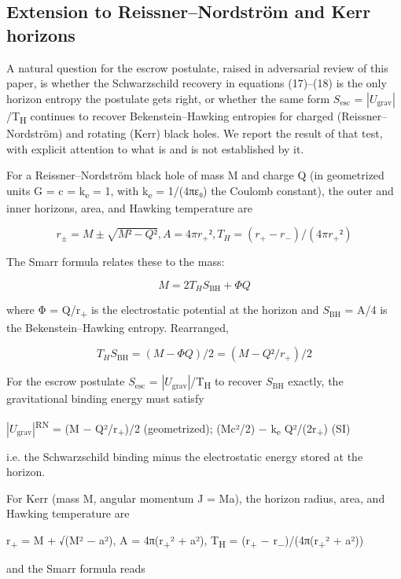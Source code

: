 \documentclass[11pt]{article}
\begin{document}
\subsection{Extension to Reissner--Nordström and Kerr horizons}

A natural question for the escrow postulate, raised in adversarial
review of this paper, is whether the Schwarzschild recovery in equations
(17)--(18) is the only horizon entropy the postulate gets right, or
whether the same form $S_{\mathrm{esc}}$ = $|U_{\mathrm{grav}}|$/T\textsubscript{H} continues to recover
Bekenstein--Hawking entropies for charged (Reissner--Nordström) and
rotating (Kerr) black holes. We report the result of that test, with
explicit attention to what is and is not established by it.

For a Reissner--Nordström black hole of mass M and charge Q (in
geometrized units G = c = k\textsubscript{e} = 1, with k\textsubscript{e} = 1/(4πε₀) the Coulomb
constant), the outer and inner horizons, area, and Hawking temperature
are

\[ r_\pm  = M \pm  \sqrt{M² - Q²}, A = 4πr_+², T_H = (r_+ - r_-)/(4πr_+²) \]

The Smarr formula relates these to the mass:

\[ M = 2T_H S_{\mathrm{BH}} + Φ Q \]

where Φ = Q/r\textsubscript{+} is the electrostatic potential at the horizon and $S_{\mathrm{BH}}$
= A/4 is the Bekenstein--Hawking entropy. Rearranged,

\[ T_H S_{\mathrm{BH}} = (M - Φ Q)/2 = (M - Q²/r_+)/2 \]

For the escrow postulate $S_{\mathrm{esc}}$ = $|U_{\mathrm{grav}}|$/T\textsubscript{H} to recover $S_{\mathrm{BH}}$ exactly,
the gravitational binding energy must satisfy

$|U_{\mathrm{grav}}|$\textsuperscript{RN} = (M − Q²/r\textsubscript{+})/2 (geometrized); (Mc²/2) − k\textsubscript{e} Q²/(2r\textsubscript{+})
(SI)

i.e. the Schwarzschild binding minus the electrostatic energy stored at
the horizon.

For Kerr (mass M, angular momentum J = Ma), the horizon radius, area,
and Hawking temperature are

r\textsubscript{+} = M + √(M² − a²), A = 4π(r\textsubscript{+}² + a²), T\textsubscript{H} = (r\textsubscript{+} −
r\textsubscript{−})/(4π(r\textsubscript{+}² + a²))

and the Smarr formula reads
\end{document}
